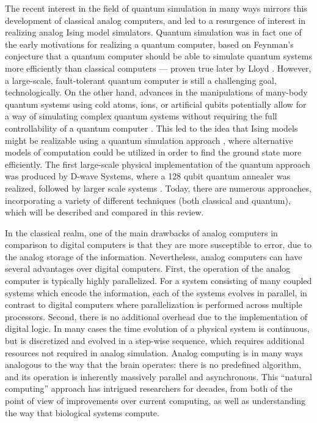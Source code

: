 \documentclass[fleqn,10pt]{wlscirep}
\def\change#1{#1}
\begin{document}
The recent interest in the field of quantum simulation  \cite{feynman1982simulating,buluta2009quantum,georgescu2014quantum} in many ways mirrors this development of classical analog computers, and led to a resurgence of interest in realizing analog Ising model simulators. Quantum simulation was in fact one of the early motivations for realizing a quantum computer, based on Feynman's conjecture that a quantum computer should be able to simulate quantum systems more efficiently than classical computers \cite{feynman1982simulating} ---  proven true later by Lloyd \cite{lloyd1996universal}.  However, a large-scale, fault-tolerant quantum computer is still a challenging goal, technologically.  On the other hand, advances in the manipulations of many-body quantum systems using cold atoms, ions, or artificial qubits potentially allow for a way of simulating complex quantum systems without requiring the full \change{ controllability of a quantum computer  \cite{greiner2002quantum,buluta2009quantum,georgescu2014quantum,
labuhn2016tunable,bernien2017probing,keesling2019quantum,scholl2021quantum}.}  This led to the idea that Ising models might be realizable using a quantum simulation approach  \cite{farhi2001quantum,byrnes2011accelerated}, where alternative models of computation could be utilized in order to find the ground state more efficiently. \change{The first large-scale physical implementation of the quantum approach was produced by D-wave Systems, where a 128 qubit quantum annealer was realized, followed by larger scale systems \cite{king2018observation,harris2018phase}.  
Today, there are numerous approaches, incorporating a variety of different techniques (both classical and quantum), which will be described and compared in this review.}


In the classical realm, one of the main drawbacks of analog computers in comparison to digital computers is that they are more susceptible to error, due to the analog storage of the information.  Nevertheless, analog computers can have several advantages over digital computers.  First, the operation of the analog computer is typically highly parallelized.  For a system consisting of many coupled systems which encode the information, each of the systems evolves in parallel, in contrast to digital computers where parallelization is performed across multiple processors. \change{Second, there is no additional overhead due to the implementation of digital logic. In many cases the time evolution of a physical system is continuous, but is discretized and evolved in a step-wise sequence, which requires additional resources not required in analog simulation. }
Analog computing is in many \change{ways} analogous to the way that the brain operates:  there is no predefined algorithm, and its operation is inherently massively parallel \change{and asynchronous}.  This ``natural computing'' approach has intrigued researchers for decades, from both of the point of view of improvements over current computing, as well as understanding the way that biological systems compute.  
\end{document}
